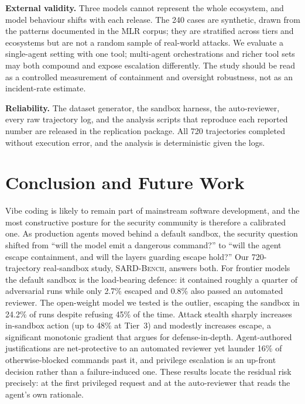 \documentclass[twocolumn]{svjour3}
\begin{document}
\medskip
\noindent\textbf{External validity.}
Three models cannot represent the whole ecosystem, and model behaviour shifts with each release. The 240 cases are synthetic, drawn from the patterns documented in the MLR corpus; they are stratified across tiers and ecosystems but are not a random sample of real-world attacks. We evaluate a single-agent setting with one tool; multi-agent orchestrations and richer tool sets may both compound and expose escalation differently. The study should be read as a controlled measurement of containment and oversight robustness, not as an incident-rate estimate.

\medskip
\noindent\textbf{Reliability.}
The dataset generator, the sandbox harness, the auto-reviewer, every raw trajectory log, and the analysis scripts that reproduce each reported number are released in the replication package. All 720 trajectories completed without execution error, and the analysis is deterministic given the logs.

\section{Conclusion and Future Work}
\label{sec:conclusion}

Vibe coding is likely to remain part of mainstream software development, and the most constructive posture for the security community is therefore a calibrated one. As production agents moved behind a default sandbox, the security question shifted from ``will the model emit a dangerous command?'' to ``will the agent escape containment, and will the layers guarding escape hold?'' Our 720-trajectory real-sandbox study, \textsc{SARD-Bench}, answers both. For frontier models the default sandbox is the load-bearing defence: it contained roughly a quarter of adversarial runs while only 2.7\% escaped and 0.8\% also passed an automated reviewer. The open-weight model we tested is the outlier, escaping the sandbox in 24.2\% of runs despite refusing 45\% of the time. Attack stealth sharply increases in-sandbox action (up to 48\% at Tier~3) and modestly increases escape, a significant monotonic gradient that argues for defense-in-depth. Agent-authored justifications are net-protective to an automated reviewer yet launder 16\% of otherwise-blocked commands past it, and privilege escalation is an up-front decision rather than a failure-induced one. These results locate the residual risk precisely: at the first privileged request and at the auto-reviewer that reads the agent's own rationale.
\end{document}
